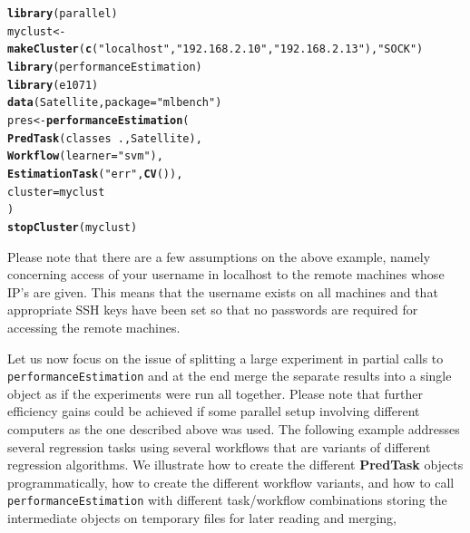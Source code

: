 \documentclass[10pt,a4paper]{article}\usepackage[]{graphicx}\usepackage[]{color}
\makeatletter
\newcommand{\hlstr}[1]{\textcolor[rgb]{0.192,0.494,0.8}{#1}}%
\newcommand{\hlopt}[1]{\textcolor[rgb]{0,0,0}{#1}}%
\newcommand{\hlstd}[1]{\textcolor[rgb]{0.345,0.345,0.345}{#1}}%
\newcommand{\hlkwb}[1]{\textcolor[rgb]{0.69,0.353,0.396}{#1}}%
\newcommand{\hlkwc}[1]{\textcolor[rgb]{0.333,0.667,0.333}{#1}}%
\newcommand{\hlkwd}[1]{\textcolor[rgb]{0.737,0.353,0.396}{\textbf{#1}}}%
\newenvironment{kframe}{%
 \def\at@end@of@kframe{}%
 \ifinner\ifhmode%
  \def\at@end@of@kframe{\end{minipage}}%
  \begin{minipage}{\columnwidth}%
 \fi\fi%
 \def\FrameCommand##1{\hskip\@totalleftmargin \hskip-\fboxsep
 \colorbox{shadecolor}{##1}\hskip-\fboxsep
     \hskip-\linewidth \hskip-\@totalleftmargin \hskip\columnwidth}%
 \MakeFramed {\advance\hsize-\width
   \@totalleftmargin\z@ \linewidth\hsize
   \@setminipage}}%
 {\par\unskip\endMakeFramed%
 \at@end@of@kframe}
\newenvironment{knitrout}{}{} %
\makeatother
\begin{document}
\begin{knitrout}\small
{}\color{fgcolor}\begin{kframe}
\begin{alltt}
\hlkwd{library}\hlstd{(parallel)}
\hlstd{myclust} \hlkwb{<-} \hlkwd{makeCluster}\hlstd{(}\hlkwd{c}\hlstd{(}\hlstr{"localhost"}\hlstd{,}\hlstr{"192.168.2.10"}\hlstd{,}\hlstr{"192.168.2.13"}\hlstd{),}\hlstr{"SOCK"}\hlstd{)}
\hlkwd{library}\hlstd{(performanceEstimation)}
\hlkwd{library}\hlstd{(e1071)}
\hlkwd{data}\hlstd{(Satellite,}\hlkwc{package}\hlstd{=}\hlstr{"mlbench"}\hlstd{)}
\hlstd{pres} \hlkwb{<-} \hlkwd{performanceEstimation}\hlstd{(}
    \hlkwd{PredTask}\hlstd{(classes} \hlopt{~} \hlstd{.,Satellite),}
    \hlkwd{Workflow}\hlstd{(}\hlkwc{learner}\hlstd{=}\hlstr{"svm"}\hlstd{),}
    \hlkwd{EstimationTask}\hlstd{(}\hlstr{"err"}\hlstd{,}\hlkwd{CV}\hlstd{()),}
    \hlkwc{cluster}\hlstd{=myclust}
    \hlstd{)}
\hlkwd{stopCluster}\hlstd{(myclust)}
\end{alltt}
\end{kframe}
\end{knitrout}

Please note that there are a few assumptions on the above example, namely concerning access of your username in localhost to the remote machines whose IP's are given. This means that the username exists on all machines and that appropriate SSH keys have been set so that no passwords are required for accessing the remote machines.

\vspace*{0.5cm}

Let us now focus on the issue of splitting a large experiment in partial calls to \texttt{performanceEstimation} and at the end merge the separate results into a single object as if the experiments were run all together. Please note that further efficiency gains could be achieved if some parallel setup involving different computers as the one described above was used. The following example addresses several regression tasks using several workflows that are variants of different regression algorithms. We illustrate how to create the different \textbf{PredTask} objects programmatically,  how to create the different workflow variants, and how to call \texttt{performanceEstimation} with different task/workflow combinations storing the intermediate objects on temporary files for later reading and merging,
\end{document}
